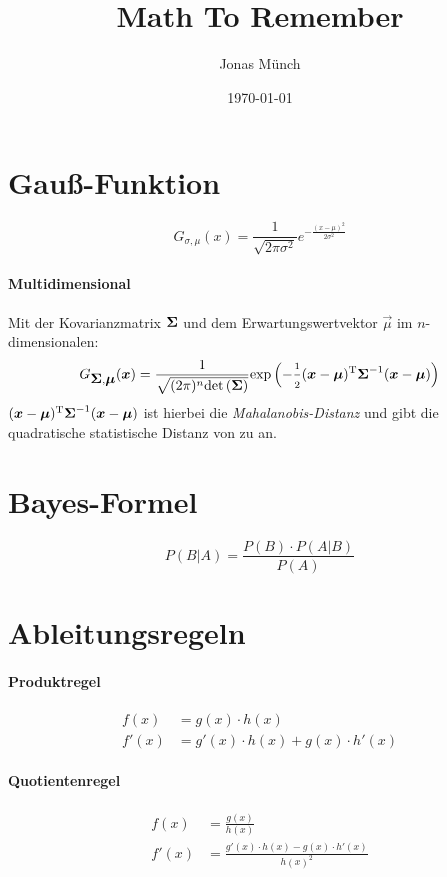 \documentclass[a4paper]{scrartcl}
\begin{document}
\title{Math To Remember}
\author{Jonas Münch}
\date{\today}

\maketitle

\tableofcontents


\section{Gauß-Funktion}
\[
  G_{\sigma, \mu} (x) = \frac{1}{\sqrt{2 \pi \sigma^2}}e^{-\frac{(x - \mu)^2}{2 \sigma^2}}
\]

\paragraph{Multidimensional}
Mit der Kovarianzmatrix $\mbox{\boldmath$\Sigma$}$ und dem Erwartungswertvektor $\vec{\mu}$ im $n$-dimensionalen:
\[
  G_{\mbox{\boldmath$\Sigma$}, \mbox{\boldmath$\mu$}} (\mbox{\boldmath$x$}) = 
  \frac{1}{\sqrt{(2 \pi)^n {\mathord{\det\left( \mbox{\boldmath$\Sigma$} \right)}}}}{\mathord{\rm {exp}}}\left( -\frac{\scriptstyle 1}{\scriptstyle 2} {(\mbox{\boldmath$x$}-\mbox{\boldmath$\mu$})}\textsuperscript{T} \mbox{\boldmath$\Sigma$}^{-1} (\mbox{\boldmath$x$}-\mbox{\boldmath$\mu$})\right)
\]
${(\mbox{\boldmath$x$}-\mbox{\boldmath$\mu$})}\textsuperscript{T} \mbox{\boldmath$\Sigma$}^{-1} (\mbox{\boldmath$x$}-\mbox{\boldmath$\mu$})$ ist hierbei die \emph{Mahalanobis-Distanz} und gibt die quadratische statistische Distanz von  zu \vec{\mu} an.

\section{Bayes-Formel}

\[
  P(B|A) = \frac{P(B) \cdot P(A|B)}{P(A)}
\]

\section{Ableitungsregeln}

\paragraph{Produktregel}
\begin{align*}
    f(x) &= g(x) \cdot h(x) \\
    f'(x) &= g'(x) \cdot h(x) + g(x) \cdot h'(x)
\end{align*}

\paragraph{Quotientenregel}
\begin{align*}
    f(x) &= \frac{g(x)}{h(x)} \\
    f'(x) &= \frac{g'(x) \cdot h(x) - g(x) \cdot h'(x)}{h(x)^2}
\end{align*}
\end{document}
